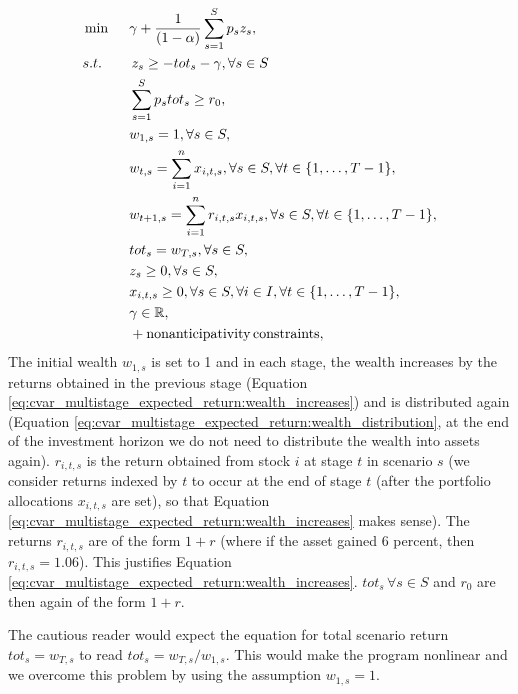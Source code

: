 \begin{alignat}{10}
& \min \, \, \, && \gamma + \frac{1}{(1-\alpha)} \sum_{s=1}^S p_s z_s, \label{eq:cvar_multistage_expected_return}  \\
&s.t. && \, z_s \geq  -tot_s -\gamma, \forall s \in S \nonumber \\
&  && \sum_{s=1}^{S} p_s tot_s \geq r_0, \nonumber \\
& && w_{1,s}=1, \forall s \in S, \nonumber \\
& && w_{t,s}=\sum_{i=1}^{n} x_{i,t,s}, \forall s \in S, \forall t \in \{1,\dots,T-1\}, \label{eq:cvar_multistage_expected_return:wealth_distribution} \\
& && w_{t+1,s}=\sum_{i=1}^{n} r_{i,t,s} x_{i,t,s}, \forall s \in S, \forall t \in \{1,\dots ,T-1\}, \label{eq:cvar_multistage_expected_return:wealth_increases} \\
& && tot_s = w_{T,s}, \forall s \in S, \nonumber \\
& && z_s \geq 0, \forall s \in S, \nonumber \\
& && x_{i,t,s} \geq 0, \forall s \in S, \forall i \in I, \forall t \in \{1,\dots ,T-1\}, \nonumber \\
& && \gamma \in \R ,\nonumber \\
& && + \mathrm{nonanticipativity \, constraints}, \nonumber
\end{alignat}
The initial wealth $w_{1,s}$ is set to 1 and in each stage, the wealth increases by the returns obtained in the previous stage (Equation \ref{eq:cvar_multistage_expected_return:wealth_increases}) and is distributed again (Equation \ref{eq:cvar_multistage_expected_return:wealth_distribution}, at the end of the investment horizon we do not need to distribute the wealth into assets again). $r_{i,t,s}$ is the return obtained from stock $i$ at stage $t$ in scenario $s$ (we consider returns indexed by $t$ to occur at the end of stage $t$ (after the portfolio allocations $x_{i,t,s}$ are set), so that Equation \ref{eq:cvar_multistage_expected_return:wealth_increases} makes sense). The returns $r_{i,t,s}$ are of the form $1+r$ (where if the asset gained 6 percent, then $r_{i,t,s}=1.06$). This justifies Equation \ref{eq:cvar_multistage_expected_return:wealth_increases}. $tot_s \, \forall s \in S$ and $r_0$ are then again of the form $1+r$.

\begin{rem}
The cautious reader would expect the equation for total scenario return $tot_s = w_{T,s}$ to read $tot_s = w_{T,s}/w_{1,s}$. This would make the program nonlinear and we overcome this problem by using the assumption $w_{1,s}=1$.
\end{rem}


